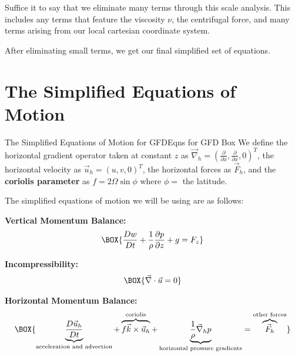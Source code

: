 Suffice it to say that we eliminate many terms through this scale analysis. This includes any terms that feature the viscosity $\nu$, the centrifugal force, and many terms arising from our local cartesian coordinate system. 

After eliminating small terms, we get our final simplified set of equations. 

\section{The Simplified Equations of Motion}

\begin{fact}{The Simplified Equations of Motion for GFD}{Eqns for GFD Box}\label{Eqns for GFD Box}
    We define the horizontal gradient operator taken at constant $z$ as $\vec{\nabla}_h=\left( \frac{\partial}{\partial x},\frac{\partial}{\partial x},0 \right)^T$, the horizontal velocity as $\vec{u}_h=\left( u,v,0 \right)^T$, the horizontal forces as $\vec{F}_h$, and the \textbf{coriolis parameter} as $f=2\Omega\sin\phi$ where $\phi=$ the latitude.

    The simplified equations of motion we will be using are as follows: \vspace{2mm}

    \begin{minipage}{0.48\linewidth}
        \centering
        \textbf{Vertical Momentum Balance:}
        \begin{gather}
            \label{Vertical Approximate}
            \BOX{\frac{Dw}{Dt}+\frac{1}{\rho}\frac{\partial p }{\partial z}+g=F_z}
        \end{gather}
    \end{minipage}
    \hfill
    \begin{minipage}{0.48\linewidth}
        \centering
        \textbf{Incompressibility:}
        \begin{gather}
            \label{Incompressibility}
        \BOX{\vec{\nabla}\cdot\vec{u}=0}
        \end{gather}
    \end{minipage}

    \vspace{2mm}
    \centering
    \textbf{Horizontal Momentum Balance:}
    \begin{gather}
        \label{Horizontal Approximate}
        \BOX{\underbrace{\frac{D\vec{u}_h}{Dt}}_\text{acceleration and advection}+
        \overbrace{f\vec{k}\times\vec{u}_h}^\text{coriolis}+
        \underbrace{\frac{1}{\rho}\vec{\nabla}_hp}_\text{horizontal pressure gradients}=\overbrace{\vec{F}_h}^\text{other forces}}
    \end{gather}
\end{fact}

